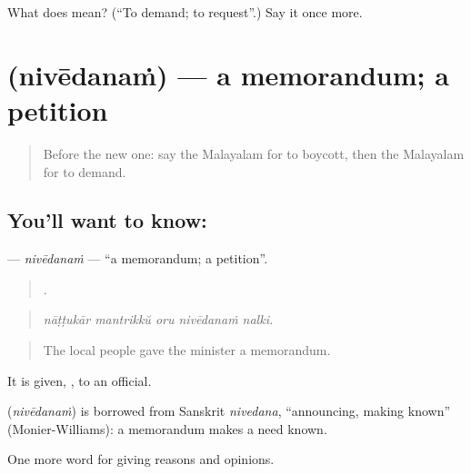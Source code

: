 \begin{tcolorbox}[breakable,colback=teal!4,colframe=teal!35!black,title={Before you move on}]
What does  mean? (\textquotedblleft{}To demand; to request\textquotedblright{}.) Say it once more.
\end{tcolorbox}
\section[\texorpdfstring{\ml{നിവേദനം} (nivēdanaṁ)}{നിവേദനം (nivēdanaṁ)}]{ (nivēdanaṁ) — a memorandum; a petition}

\label{lesson:ML-C426-nivedanam}



\begin{quote}
Before the new one: say the Malayalam for to boycott, then the Malayalam for to demand.
\end{quote}

\subsection*{You'll want to know: }
\textbf{} — \emph{nivēdanaṁ} — \textquotedblleft{}a memorandum; a petition\textquotedblright{}.

\begin{quote}
    .
\end{quote}

\begin{quote}
\emph{nāṭṭukār mantrikkŭ oru nivēdanaṁ nalki.}
\end{quote}

\begin{quote}
The local people gave the minister a memorandum.
\end{quote}

It is given, , to an official.

\begin{cousinweb}
\textbf{} (\emph{nivēdanaṁ}) is borrowed from Sanskrit \emph{nivedana}, \textquotedblleft{}announcing, making known\textquotedblright{} (Monier-Williams): a memorandum makes a need known.
\end{cousinweb}

\begin{grammarlens}[title={What you've built}]
One more word for giving reasons and opinions.
\end{grammarlens}


